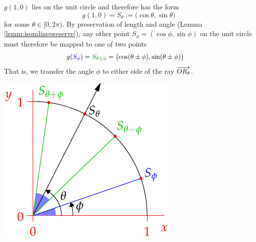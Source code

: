 \begin{enumerate}
\begin{minipage}[t]{0.31\linewidth}
\end{minipage}\bigbreak
\begin{minipage}[t]{0.64\linewidth}\vspace{0pt}
	\item $g(1,0)$ lies on the unit circle and therefore has the form
	\[g(1,0)=S_\theta:=\bigl(\cos\theta,\sin\theta\bigr)\]
	for some $\theta\in[0,2\pi)$. By preservation of length and angle (Lemma \ref{lemm:isomlinepreserve}), any other point $S_\phi=(\cos\phi,\sin\phi)$ on the unit circle must therefore be mapped to one of two points
	\begin{align*}
	&g(\textcolor{blue}{S_\phi})=\textcolor{Green}{S_{\theta\pm\phi}} =\bigl(\cos(\theta\pm\phi),\sin(\theta\pm\phi)\bigr)
	\end{align*}
	That is, we transfer the angle $\phi$ to either side of the ray $\overrightarrow{OR_\theta}$.
\end{minipage}\hfill
\begin{minipage}[t]{0.34\linewidth}\vspace{0pt}
\flushright\includegraphics[scale=0.95]{isom-rot2}
\end{minipage}
\end{enumerate}

